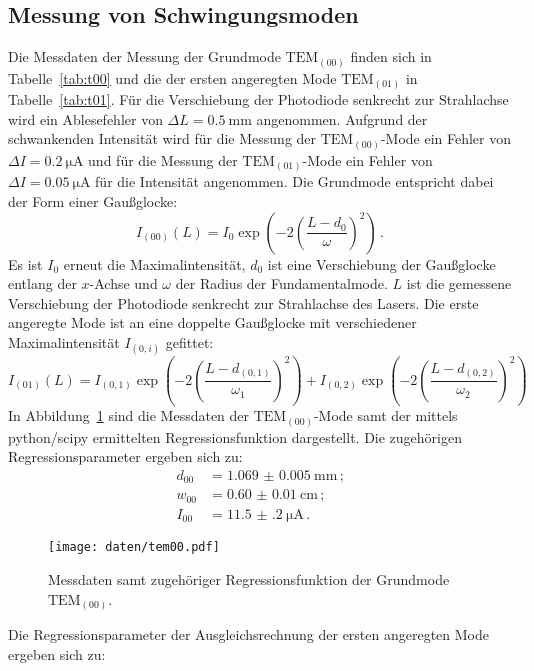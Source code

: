 \subsection{Messung von Schwingungsmoden}
Die Messdaten der Messung der Grundmode $\text{TEM}_{(00)}$ finden sich in Tabelle~\ref{tab:t00} und die der ersten angeregten Mode $\text{TEM}_{(01)}$ in Tabelle~\ref{tab:t01}.
Für die Verschiebung der Photodiode senkrecht zur Strahlachse wird ein Ablesefehler von $\Delta L=\SI{0.5}{\milli\meter}$ angenommen.
Aufgrund der schwankenden Intensität wird für die Messung der $\text{TEM}_{(00)}$-Mode ein Fehler von $\Delta I=\SI{0.2}{\micro\ampere}$ und für die Messung der $\text{TEM}_{(01)}$-Mode ein Fehler von $\Delta I=\SI{0.05}{\micro\ampere}$ für die Intensität angenommen.
Die Grundmode entspricht dabei der Form einer Gaußglocke:
\begin{equation}
  I_{(00)}(L)=I_0 \exp\left(-2\left(\frac{L-d_0}{\omega}\right)^2\right)\,\text{.}
\end{equation}
Es ist $I_0$ erneut die Maximalintensität, $d_0$ ist eine Verschiebung der Gaußglocke entlang der $x$-Achse und $\omega$ der Radius der Fundamentalmode. $L$ ist die gemessene Verschiebung der Photodiode senkrecht zur Strahlachse des Lasers.
Die erste angeregte Mode ist an eine doppelte Gaußglocke mit verschiedener Maximalintensität $I_{(0,i)}$ gefittet:
\begin{equation}
    I_{(01)}(L)=I_{(0,1)} \exp \left(-2\left( \frac{L-d_{(0,1)}}{\omega_1}\right)^2\right)+I_{(0,2)} \exp \left(-2\left( \frac{L-d_{(0,2)}}{\omega_2}\right)^2\right)
\end{equation}
In Abbildung~\ref{fig:tem00} sind die Messdaten der $\text{TEM}_{(00)}$-Mode samt der mittels python/scipy ermittelten Regressionsfunktion dargestellt.
Die zugehörigen Regressionsparameter ergeben sich zu:
\begin{align}
  d_{00}&=\SI{1.069(5)}{\milli\meter}\,\text{;}\\ w_{00}&=\SI{0.60(1)}{\centi\meter}\,\text{;}\\ I_{00}&=\SI{11.5(2)}{\micro\ampere}\,\text{.}
\end{align}
\begin{figure}
  \centering
  \texttt{[image: daten/tem00.pdf]}
  \caption{Messdaten samt zugehöriger Regressionsfunktion der Grundmode $\text{TEM}_{(00)}$.}
  \label{fig:tem00}
\end{figure}


Die Regressionsparameter der Ausgleichsrechnung der ersten angeregten Mode ergeben sich zu:
